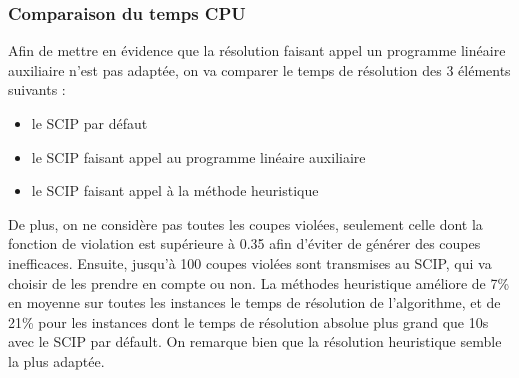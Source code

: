 \documentclass[12pt]{report}
\begin{document}
\subsubsection{Comparaison du temps CPU}
Afin de mettre en évidence que la résolution faisant appel un programme linéaire auxiliaire n'est pas adaptée, on va comparer le temps de résolution des 3 éléments suivants :
\begin{itemize}
    \item le SCIP par défaut
    \item le SCIP faisant appel au programme linéaire auxiliaire 
    \item le SCIP faisant appel à la méthode heuristique
\end{itemize}
De plus, on ne considère pas toutes les coupes violées, seulement celle dont la fonction de violation est supérieure à 0.35 afin d'éviter de générer des coupes inefficaces. Ensuite, jusqu'à 100 coupes violées sont transmises au SCIP, qui va choisir de les prendre en compte ou non.
La méthodes heuristique améliore de 7\% en moyenne sur toutes les instances le temps de résolution de l'algorithme, et de 21\% pour les instances dont le temps de résolution absolue plus grand que 10s avec le SCIP par défault.
\newline
On remarque bien que la résolution heuristique semble la plus adaptée.




\end{document}
